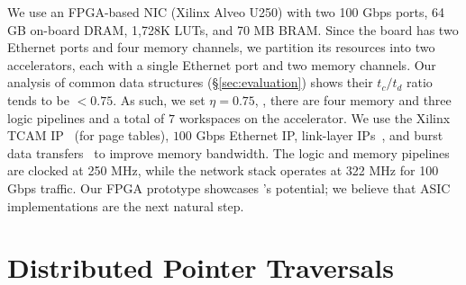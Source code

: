  We use an FPGA-based NIC (Xilinx Alveo U250) with two 100 Gbps ports, 64 GB on-board DRAM, 1,728K LUTs, and 70 MB BRAM. Since the board has two Ethernet ports and four memory channels, we partition its resources into two \pulse accelerators, each with a single Ethernet port and two memory channels. Our analysis of common data structures (\S\ref{sec:evaluation}) shows their $t_c/t_d$ ratio tends to be $<0.75$. As such, we set $\eta=0.75$, \ie, there are four memory and three logic pipelines and a total of $7$ workspaces on the accelerator.
We use the Xilinx TCAM IP~\cite{tcam_ip} (for page tables), $100$ Gbps Ethernet IP, link-layer IPs~\cite{xilinx_network}, and burst data transfers~\cite{burstdatatransfer} to improve memory bandwidth. The logic and memory pipelines are clocked at 250 MHz, while the network stack operates at 322 MHz for 100 Gbps traffic. Our FPGA prototype showcases \pulse's potential; we believe that ASIC implementations are the next natural step. 



\section{Distributed Pointer Traversals}
\label{sec:distributed}


